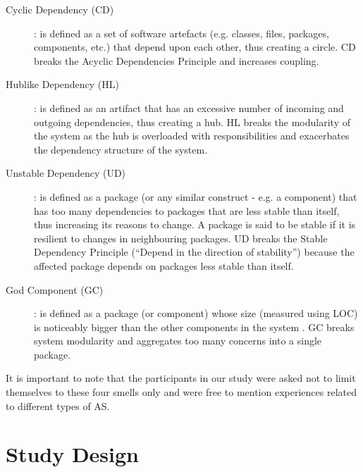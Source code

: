 \begin{description}
	\item[Cyclic Dependency (CD)]: is defined as a set of software artefacts (e.g. classes, files, packages, components, etc.) that depend upon each other, thus creating a circle. CD breaks the Acyclic Dependencies Principle \cite{Martin2018} and increases coupling.
	
	\item[Hublike Dependency (HL)]: is defined as an artifact that has an excessive number of incoming and outgoing dependencies, thus creating a hub. HL breaks the modularity of the system as the hub is overloaded with responsibilities and exacerbates the dependency structure of the system.

	\item[Unstable Dependency (UD)]: is defined as a package (or any similar construct - e.g. a component) that has too many dependencies to packages that are less stable than itself, thus increasing its reasons to change. A package is said to be stable if it is resilient to changes in neighbouring packages. UD breaks the Stable Dependency Principle (“Depend in the direction of stability”) \cite{Martin2018} because the affected package depends on packages less stable than itself.
	
	\item[God Component (GC)]: is defined as a package (or component) whose size (measured using LOC) is noticeably bigger than the other components in the system  \cite{Lippert2006}. GC breaks system modularity and aggregates too many concerns into a single package.
\end{description}
It is important to note that the participants in our study were asked not to limit themselves to these four smells only and were free to mention experiences related to different types of AS.

\section{Study Design}
